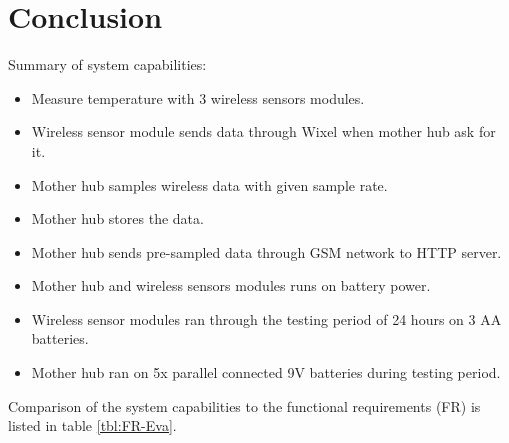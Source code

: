 \section*{Conclusion}
Summary of system capabilities:
\begin{itemize}
	\item Measure temperature with 3 wireless sensors modules.
	\item Wireless sensor module sends data through Wixel when mother hub ask for it.
	\item Mother hub samples wireless data with given sample rate.
	\item Mother hub stores the data.
	\item Mother hub sends pre-sampled data through GSM network to HTTP server.
	\item Mother hub and wireless sensors modules runs on battery power.
	\item Wireless sensor modules ran through the testing period of 24 hours on 3 AA batteries.
	\item Mother hub ran on 5x parallel connected 9V batteries during testing period.
\end{itemize}
 
Comparison of the system capabilities to the functional requirements (FR) is listed in table \ref{tbl:FR-Eva}.
 
